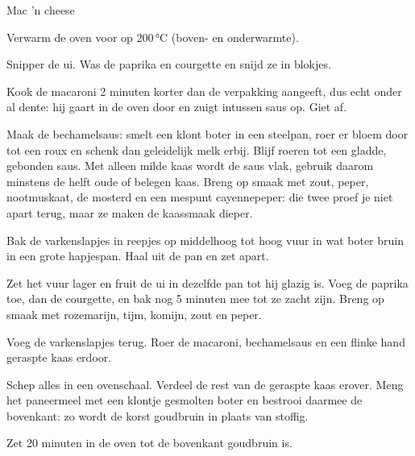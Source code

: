 \begin{recipe}{Mac 'n cheese}
\begin{steps}
  \item Verwarm de oven voor op 200\,°C (boven- en onderwarmte).
  \item Snipper de ui. Was de paprika en courgette en snijd ze in blokjes.
  \item Kook de macaroni 2 minuten korter dan de verpakking aangeeft, dus
        echt onder al dente: hij gaart in de oven door en zuigt intussen saus
        op. Giet af.
  \item Maak de bechamelsaus: smelt een klont boter in een steelpan, roer er
        bloem door tot een roux en schenk dan geleidelijk melk erbij. Blijf
        roeren tot een gladde, gebonden saus. Met alleen milde kaas wordt de
        saus vlak, gebruik daarom minstens de helft oude of belegen kaas.
        Breng op smaak met zout, peper, nootmuskaat, de mosterd en een
        mespunt cayennepeper: die twee proef je niet apart terug, maar ze
        maken de kaassmaak dieper.
  \item Bak de varkenslapjes in reepjes op middelhoog tot hoog vuur in wat boter bruin
        in een grote hapjespan. Haal uit de pan en zet apart.
  \item Zet het vuur lager en fruit de ui in dezelfde pan tot hij glazig is.
        Voeg de paprika toe, dan de courgette, en bak nog 5 minuten mee tot
        ze zacht zijn. Breng op smaak met rozemarijn, tijm, komijn, zout en
        peper.
  \item Voeg de varkenslapjes terug. Roer de macaroni, bechamelsaus en een
        flinke hand geraspte kaas erdoor.
  \item Schep alles in een ovenschaal. Verdeel de rest van de geraspte kaas
        erover. Meng het paneermeel met een klontje gesmolten boter en
        bestrooi daarmee de bovenkant: zo wordt de korst goudbruin in plaats
        van stoffig.
  \item Zet 20 minuten in de oven tot de bovenkant goudbruin is.
\end{steps}
\end{recipe}
